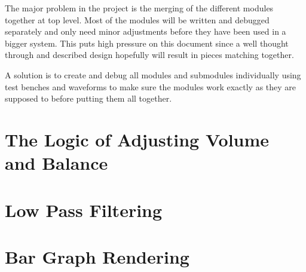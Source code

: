 

The major problem in the project is the merging of the different
modules together at top level. Most of the modules will be written and
debugged separately and only need minor adjustments before they have
been used in a bigger system.  This puts high pressure on this
document since a well thought through and described design hopefully
will result in pieces matching together.

A solution is to create and debug all modules and submodules
individually using test benches and waveforms to make sure the modules
work exactly as they are supposed to before putting them all together.

\section{The Logic of Adjusting Volume and Balance}


\section{Low Pass Filtering}


\section{Bar Graph Rendering}
 

